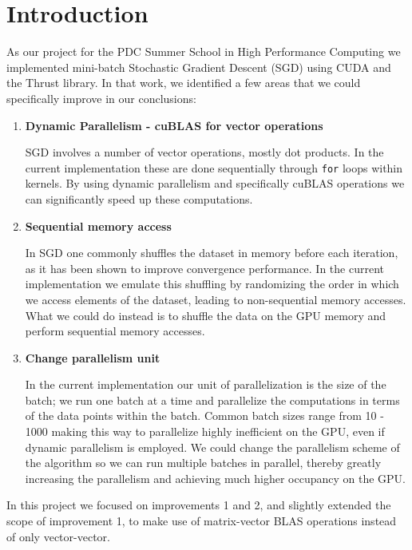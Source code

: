 \documentclass[11pt,a4paper]{article}
\begin{document}
\section{Introduction}
\label{sec:introduction}

As our project for the PDC Summer School in High Performance Computing we implemented mini-batch
Stochastic Gradient Descent (SGD) using CUDA and the Thrust library. In that work,
we identified a few areas that we could specifically improve in our conclusions:

\begin{enumerate}
	\item \textbf{Dynamic Parallelism - cuBLAS for vector operations}
	
	SGD involves a number of vector operations, mostly dot products.
	In the current implementation these are done sequentially through \texttt{for} loops within kernels.
	By using dynamic parallelism and specifically cuBLAS operations
	we can significantly speed up these computations.
	
	
	\item \textbf{Sequential memory access}
	
	In SGD one commonly shuffles the dataset in memory before each iteration, as it has been shown to improve
	convergence performance. In the current implementation we emulate this shuffling by randomizing the
	order in which we access elements of the dataset, leading to non-sequential memory 
	accesses. What we could do instead is to shuffle the data on the GPU memory and perform 
	sequential memory accesses.
	
	\item \textbf{Change parallelism unit}
	
	In the current implementation our unit of parallelization is the size of the batch; we run one batch 
	at a time and parallelize
	the computations in terms of the data points within the batch. Common batch sizes range from 10 - 1000
	making this way to parallelize highly inefficient on the GPU, even if dynamic parallelism is employed.
	We could change the parallelism scheme of the algorithm so we can run multiple
	batches in parallel, thereby greatly increasing the parallelism and achieving much 
	higher occupancy on the GPU.
\end{enumerate}

In this project we focused on improvements 1 and 2, and slightly extended the scope of improvement 1,
to make use of matrix-vector BLAS operations instead of only vector-vector.
\end{document}
